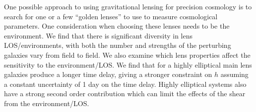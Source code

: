 One possible approach to using gravitational lensing for precision cosmology is to search for one or a few ``golden lenses'' to use to measure cosmological parameters. One consideration when choosing these lenses needs to be the environment. We find that there is significant diversity in lens LOS/environments, with both the number and strengths of the perturbing galaxies vary from field to field.  We also examine which lens properties affect the sensitivity to the environment/LOS. We find that for a highly elliptical main lens galaxies produce a longer time delay, giving a stronger constraint on $h$ assuming a constant uncertainty of 1 day on the time delay. Highly elliptical systems also have a strong second order contribution which can limit the effects of the shear from the environment/LOS. 